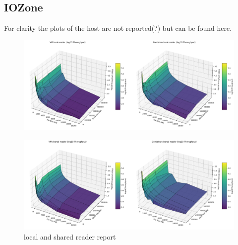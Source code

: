 \subsection{IOZone}

For clarity the plots of the host are not reported(?) but can be found here.
\begin{figure}[H]
    \centering
    \includegraphics[width=\linewidth]{assets/VM local reader_Container local reader_log_surfaces.png}
    \end{figure}
\begin{figure}[H]
    \centering
    \includegraphics[width=\linewidth]{assets/VM shared reader_Container shared reader_log_surfaces.png}
    \caption{local and shared reader report}
    \label{fig:reader local and shared}
\end{figure}

